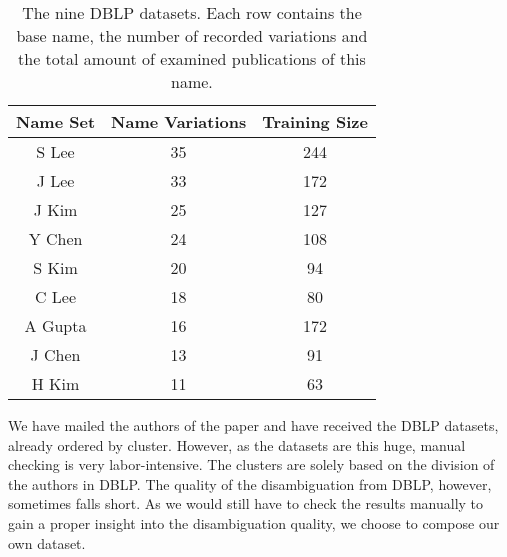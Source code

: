 \begin{table}
	\centering
		\begin{tabular}[ht]{|c|c|c|}
			\hline
			\bfseries{Name Set} & \bfseries{Name Variations} & \bfseries{Training Size} \\
			\hline
			S Lee & 35 & 244 \\
			\hline
			J Lee & 33 & 172 \\
			\hline
			J Kim & 25 & 127 \\
			\hline
			Y Chen & 24 & 108 \\
			\hline
			S Kim & 20 & 94 \\
			\hline
			C Lee & 18 & 80 \\
			\hline
			A Gupta & 16 & 172 \\
			\hline
			J Chen & 13 & 91 \\
			\hline
			H Kim & 11 & 63 \\
			\hline
		\end{tabular}
	\caption{The nine DBLP datasets. Each row contains the base name, the number of recorded variations and the total amount of examined publications of this name.}
	\label{tab:TheNineDBLPDatasetsOfDifferentNamesAndTheDataSize}
\end{table}

We have mailed the authors of the paper \cite{han2004two} and have received the DBLP datasets, already ordered by cluster. However, as the datasets are this huge, manual checking is very labor-intensive. The clusters are solely based on the division of the authors in DBLP. The quality of the disambiguation from DBLP, however, sometimes falls short. As we would still have to check the results manually to gain a proper insight into the disambiguation quality, we choose to compose our own dataset.

